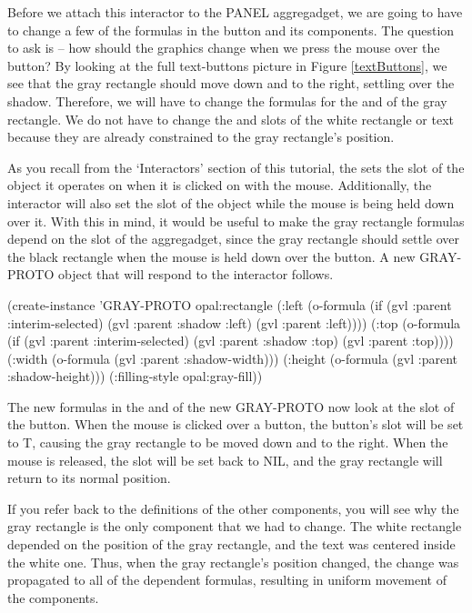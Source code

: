 Before we attach this interactor to the PANEL aggregadget, we are
going to have to change a few of the formulas in the button and its
components.  The question to ask is -- how should the graphics change
when we press the mouse over the button?  By looking at the full
text-buttons picture in Figure \ref{textButtons}, we see that the
gray rectangle should move down and to the right, settling over the
shadow.  Therefore, we will have to change the formulas for the
 and  of the gray rectangle.  We do not have to
change the  and  slots of the white rectangle or
text because they are already constrained to the gray rectangle's
position.

As you recall from the `Interactors' section of this
tutorial, the  sets the  slot of
the object it operates on when it is clicked on with the mouse.
Additionally, the interactor will also set the 
slot of the object while the mouse is being held down over it.  With
this in mind, it would be useful to make the gray rectangle formulas
depend on the  slot of the aggregadget, since
the gray rectangle should settle over the black rectangle when the
mouse is held down over the button.  A new GRAY-PROTO object that will
respond to the interactor follows.

\begin{programexample}
(create-instance 'GRAY-PROTO opal:rectangle
   (:left (o-formula (if (gvl :parent :interim-selected)
			 (gvl :parent :shadow :left)
			 (gvl :parent :left))))
   (:top (o-formula (if (gvl :parent :interim-selected)
			(gvl :parent :shadow :top)
			(gvl :parent :top))))
   (:width (o-formula (gvl :parent :shadow-width)))
   (:height (o-formula (gvl :parent :shadow-height)))
   (:filling-style opal:gray-fill))
\end{programexample}

The new formulas in the  and  of the new GRAY-PROTO
now look at the  slot of the button.  When the
mouse is clicked over a button, the button's 
slot will be set to T, causing the gray rectangle to be moved down and
to the right.  When the mouse is released, the 
slot will be set back to NIL, and the gray rectangle will return to
its normal position.

If you refer back to the definitions of the other components, you will
see why the gray rectangle is the only component that we had to
change.  The white rectangle depended on the position of the gray
rectangle, and the text was centered inside the white one.  Thus, when
the gray rectangle's position changed, the change was propagated to
all of the dependent formulas, resulting in uniform movement of the
components.

